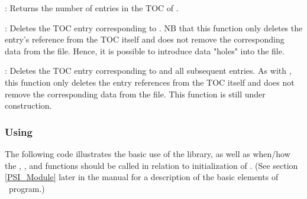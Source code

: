 : Returns the number
of entries in the TOC of .

: Deletes the TOC entry
corresponding to . NB that this function only deletes the
entry's reference from the TOC itself and does not remove the
corresponding data from the file. Hence, it is possible to introduce
data "holes" into the file.

: Deletes the TOC entry
corresponding to  and all subsequent entries. As with
, this function only deletes the entry
references from the TOC itself and does not remove the corresponding
data from the file. This function is still under construction.

\subsubsection{Using }
The following code illustrates the basic use of the library, as well
as when/how the , ,
and  functions should be called in relation to
initialization of .  (See section \ref{PSI_Module}
later in the manual for a description of the basic elements of \PSIthree\
program.)


